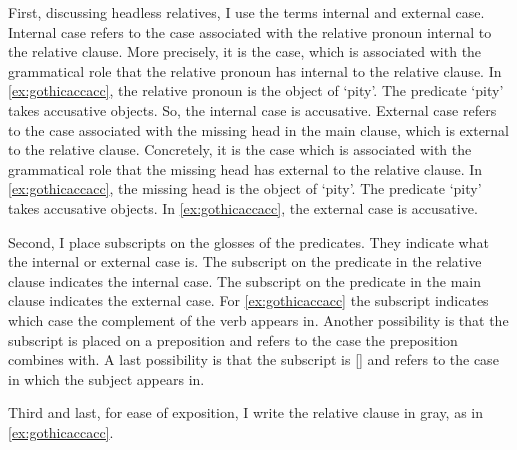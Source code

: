  First, discussing headless relatives, I use the terms internal and external case.
 Internal case refers to the case associated with the relative pronoun internal to the relative clause. More precisely, it is the case, which is associated with the grammatical role that the relative pronoun has internal to the relative clause. In \ref{ex:gothicaccacc}, the relative pronoun is the object of  `pity'. The predicate  `pity' takes accusative objects. So, the internal case is accusative.
 External case refers to the case associated with the missing head in the main clause, which is external to the relative clause. Concretely, it is the case which is associated with the grammatical role that the missing head has external to the relative clause. In \ref{ex:gothicaccacc}, the missing head is the object of  `pity'. The predicate  `pity' takes accusative objects. In \ref{ex:gothicaccacc}, the external case is accusative.

 Second, I place subscripts on the glosses of the predicates. They indicate what the internal or external case is. The subscript on the predicate in the relative clause indicates the internal case. The subscript on the predicate in the main clause indicates the external case.
 For \ref{ex:gothicaccacc} the subscript indicates which case the complement of the verb appears in. Another possibility is that the subscript is placed on a preposition and refers to the case the preposition combines with. A last possibility is that the subscript is [] and refers to the case in which the subject appears in.

 Third and last, for ease of exposition, I write the relative clause in gray, as in \ref{ex:gothicaccacc}.





%

